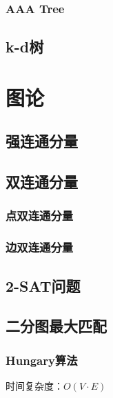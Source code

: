 \documentclass[a4paper]{article}
\newcommand{\cppcode}[1]{
    \inputminted[mathescape]{cpp}{source/#1}
}
\begin{document}
\subsubsection{AAA Tree}

\subsection{k-d树}

\section{图论}

\subsection{强连通分量}


\subsection{双连通分量}

\subsubsection{点双连通分量}

\subsubsection{边双连通分量}

\subsection{2-SAT问题}


\subsection{二分图最大匹配}

\subsubsection{Hungary算法}

时间复杂度：$O(V \cdot E)$

\cppcode{graph-theory/maximum-matching-hungary.cpp}
\end{document}
